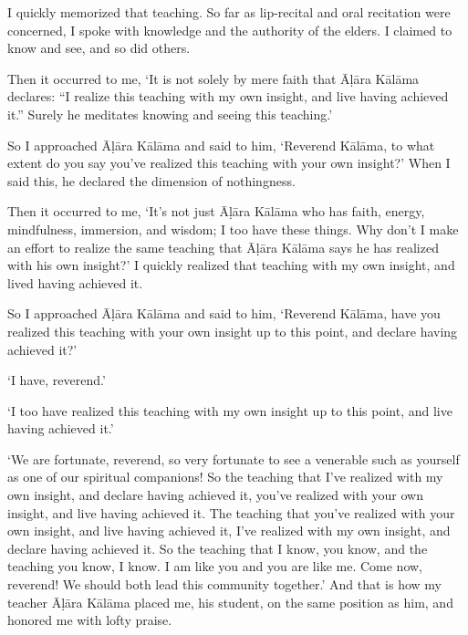 \documentclass[12pt,openany]{book}%
\begin{document}
I quickly memorized that teaching. So far as lip-recital and oral recitation were concerned, I spoke with knowledge and the authority of the elders. I claimed to know and see, and so did others. 

Then it occurred to me, ‘It is not solely by mere faith that \textsanskrit{Āḷāra} \textsanskrit{Kālāma} declares: “I realize this teaching with my own insight, and live having achieved it.” Surely he meditates knowing and seeing this teaching.’ 

So I approached \textsanskrit{Āḷāra} \textsanskrit{Kālāma} and said to him, ‘Reverend \textsanskrit{Kālāma}, to what extent do you say you’ve realized this teaching with your own insight?’ When I said this, he declared the dimension of nothingness. 

Then it occurred to me, ‘It’s not just \textsanskrit{Āḷāra} \textsanskrit{Kālāma} who has faith, energy, mindfulness, immersion, and wisdom; I too have these things. Why don’t I make an effort to realize the same teaching that \textsanskrit{Āḷāra} \textsanskrit{Kālāma} says he has realized with his own insight?’ I quickly realized that teaching with my own insight, and lived having achieved it. 

So I approached \textsanskrit{Āḷāra} \textsanskrit{Kālāma} and said to him, ‘Reverend \textsanskrit{Kālāma}, have you realized this teaching with your own insight up to this point, and declare having achieved it?’ 

‘I have, reverend.’ 

‘I too have realized this teaching with my own insight up to this point, and live having achieved it.’ 

‘We are fortunate, reverend, so very fortunate to see a venerable such as yourself as one of our spiritual companions! So the teaching that I’ve realized with my own insight, and declare having achieved it, you’ve realized with your own insight, and live having achieved it. The teaching that you’ve realized with your own insight, and live having achieved it, I’ve realized with my own insight, and declare having achieved it. So the teaching that I know, you know, and the teaching you know, I know. I am like you and you are like me. Come now, reverend! We should both lead this community together.’ And that is how my teacher \textsanskrit{Āḷāra} \textsanskrit{Kālāma} placed me, his student, on the same position as him, and honored me with lofty praise. 
\end{document}
